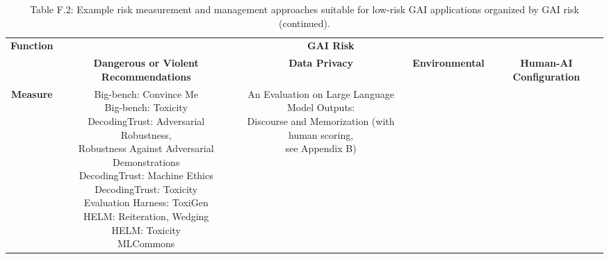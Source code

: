 \documentclass[fleqn]{article}
\begin{document}
\pagebreak

\begin{landscape}
\thispagestyle{empty}

\begin{table}[H]
	\caption*{Table F.2: Example risk measurement and management approaches suitable for low-risk GAI applications organized by GAI risk (continued).}
	\scriptsize
	\begin{tabular}{|c|c|c|c|c|}
		\hline
		\multirow{2}{*}{\textbf{Function}} & \multicolumn{4}{|c|}{\textbf{GAI Risk}} \\
		\cline{2-5}
		& \textbf{Dangerous or Violent Recommendations} & \textbf{Data Privacy} & \textbf{Environmental} &
		\textbf{Human-AI Configuration} \\
		\hline
		\textbf{Measure} &
		\makecell[l]{ 	
			\textbullet\hspace{3pt} Big-bench: Convince Me\\ 	
			\textbullet\hspace{3pt} Big-bench: Toxicity\\ 	
			\textbullet\hspace{3pt} DecodingTrust: Adversarial Robustness,\\\hspace{10pt}Robustness Against Adversarial Demonstrations\\ 	
			\textbullet\hspace{3pt} DecodingTrust: Machine Ethics\\ 	
			\textbullet\hspace{3pt} DecodingTrust: Toxicity\\ 	
			\textbullet\hspace{3pt} Evaluation Harness: ToxiGen\\ 	
			\textbullet\hspace{3pt} HELM: Reiteration, Wedging\\ 	
			\textbullet\hspace{3pt} HELM: Toxicity\\ 	
			\textbullet\hspace{3pt} MLCommons	\\ 	
		} & 
		\makecell[l]{ 	
			\textbullet\hspace{3pt} An Evaluation on Large Language Model Outputs:\\\hspace{10pt}Discourse and Memorization (with human scoring,\\\hspace{10pt}see Appendix B)\\ 	
}
\end{tabular}
\end{table}
\end{landscape}
\end{document}
